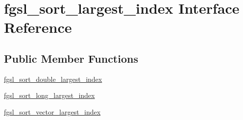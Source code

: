\hypertarget{interfacefgsl__sort__largest__index}{\section{fgsl\-\_\-sort\-\_\-largest\-\_\-index Interface Reference}
\label{interfacefgsl__sort__largest__index}
}
\subsection*{Public Member Functions}
\begin{DoxyCompactItemize}
\item 
\hyperlink{interfacefgsl__sort__largest__index_a0634bd3573e2113207452ea2a01799a2}{fgsl\-\_\-sort\-\_\-double\-\_\-largest\-\_\-index}
\item 
\hyperlink{interfacefgsl__sort__largest__index_ac1be856b6fb7a9b15f34ae528a6b9ad3}{fgsl\-\_\-sort\-\_\-long\-\_\-largest\-\_\-index}
\item 
\hyperlink{interfacefgsl__sort__largest__index_aec7f708d27ccaa19c454316e18a6f648}{fgsl\-\_\-sort\-\_\-vector\-\_\-largest\-\_\-index}
\end{DoxyCompactItemize}


